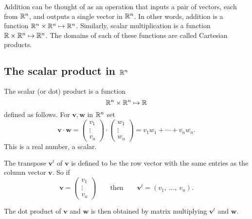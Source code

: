 \documentclass[10pt, a4paper]{article}
\newcommand{\mbf}[1]{\mathbf{#1}}
\begin{document}
Addition can be thought of as an operation that inputs a pair of vectors, each from $\mathbb{R} ^ n$, and outputs a single vector in $\mathbb{R} ^ n$. In other words, addition is a function $\mathbb{R} ^ n \times \mathbb{R} ^ n \mapsto \mathbb{R} ^ n$. Similarly, scalar multiplication is a function $\mathbb{R} \times \mathbb{R} ^ n \mapsto \mathbb{R} ^ n$. The domains of each of these functions are called Cartesian products.

\subsection{The scalar product in $\mathbb{R} ^ n$}

\begin{definition}
    The scalar (or dot) product is a function
    \[
    \mathbb{R} ^ n \times \mathbb{R} ^ n \mapsto \mathbb{R}
    \]
    defined as follows. For $\mbf{v, w}$ in $\mathbb{R} ^ n$ set
    \[
    \mbf{v \cdot w} =
    \begin{pmatrix}
        v_1 \\
        \vdots \\
        v_n
    \end{pmatrix}
    \cdot
    \begin{pmatrix}
        w_1 \\
        \vdots \\
        w_n
    \end{pmatrix}
    =
    v_1 w_1 + \cdots + v_n w_n.
    \]
    This is a real number, a scalar.
\end{definition}

The transpose $\mbf{v} ^ t$ of $\mbf{v}$ is defined to be the row vector with the same entries as the column vector $\mbf{v}$. So if
\[
\mbf{v} = \begin{pmatrix}
    v_1 \\
    \vdots \\
    v_n
\end{pmatrix}
\qquad\text{then}
\qquad\mbf{v} ^ t = (v_1,\ \dots,\ v_n).
\]

The dot product of $\mbf{v}$ and $\mbf{w}$ is then obtained by matrix multiplying $\mbf{v} ^ t$ and $\mbf{w}$.
\end{document}
